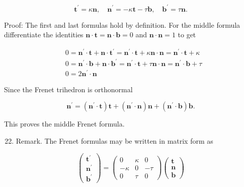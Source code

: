 \documentclass[10pt]{article}
\begin{document}
$$
\mathbf{t}^{\prime}=\kappa \mathbf{n}, \quad \mathbf{n}^{\prime}=-\kappa \mathbf{t}-\tau \mathbf{b}, \quad \mathbf{b}^{\prime}=\tau \mathbf{n} .
$$

Proof: The first and last formulas hold by definition. For the middle formula differentiate the identities $\mathbf{n} \cdot \mathbf{t}=\mathbf{n} \cdot \mathbf{b}=0$ and $\mathbf{n} \cdot \mathbf{n}=1$ to get

$$
\begin{aligned}
& 0=\mathbf{n}^{\prime} \cdot \mathbf{t}+\mathbf{n} \cdot \mathbf{t}^{\prime}=\mathbf{n}^{\prime} \cdot \mathbf{t}+\kappa \mathbf{n} \cdot \mathbf{n}=\mathbf{n}^{\prime} \cdot \mathbf{t}+\kappa \\
& 0=\mathbf{n}^{\prime} \cdot \mathbf{b}+\mathbf{n} \cdot \mathbf{b}^{\prime}=\mathbf{n}^{\prime} \cdot \mathbf{t}+\tau \mathbf{n} \cdot \mathbf{n}=\mathbf{n}^{\prime} \cdot \mathbf{b}+\tau \\
& 0=2 \mathbf{n}^{\prime} \cdot \mathbf{n}
\end{aligned}
$$

Since the Frenet trihedron is orthonormal

$$
\mathbf{n}^{\prime}=\left(\mathbf{n}^{\prime} \cdot \mathbf{t}\right) \mathbf{t}+\left(\mathbf{n}^{\prime} \cdot \mathbf{n}\right) \mathbf{n}+\left(\mathbf{n}^{\prime} \cdot \mathbf{b}\right) \mathbf{b} .
$$

This proves the middle Frenet formula.

\begin{enumerate}
  \setcounter{enumi}{21}
  \item Remark. The Frenet formulas may be written in matrix form as
\end{enumerate}

$$
\left(\begin{array}{c}
\mathbf{t}^{\prime} \\
\mathbf{n}^{\prime} \\
\mathbf{b}^{\prime}
\end{array}\right)=\left(\begin{array}{rrr}
0 & \kappa & 0 \\
-\kappa & 0 & -\tau \\
0 & \tau & 0
\end{array}\right)\left(\begin{array}{l}
\mathbf{t} \\
\mathbf{n} \\
\mathbf{b}
\end{array}\right)
$$
\end{document}
